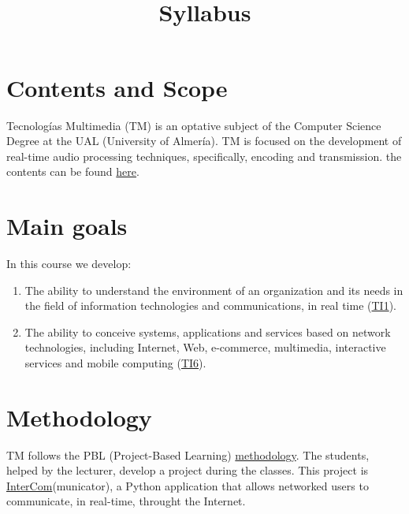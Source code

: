 

\title{\TM{} \\ Syllabus}

\maketitle

\section{Contents and Scope}

Tecnologías Multimedia (TM) is an optative subject of the Computer
Science Degree at the UAL (University of Almería). TM is focused on
the development of real-time audio processing techniques,
specifically, encoding and transmission. the contents can be found
\href{https://tecnologias-multimedia.github.io/contents/}{here}.

\section{Main goals}

In this course we develop:
\begin{enumerate}
\item The ability to understand the environment of an organization and
  its needs in the field of information technologies and
  communications, in real time
  (\href{https://www.ual.es/application/files/8516/5061/5446/memoriavig-ing-informatica-4015.pdf}{TI1}).
\item The ability to conceive systems, applications and services based
  on network technologies, including Internet, Web, e-commerce,
  multimedia, interactive services and mobile computing
  (\href{https://www.ual.es/application/files/8516/5061/5446/memoriavig-ing-informatica-4015.pdf}{TI6}).
\end{enumerate}

\section{Methodology}

TM follows the PBL (Project-Based Learning)
\href{http://portafirma.ual.es/pfirma/downloadReport/file?idDocument=4u61Ie5es2&idRequest=ZeBY35LlFa}{methodology}. The
students, helped by the lecturer, develop a project during the
classes. This project is
\href{https://github.com/Tecnologias-multimedia/intercom}{InterCom}(municator),
a Python application that allows networked users to communicate, in
real-time, throught the Internet.


